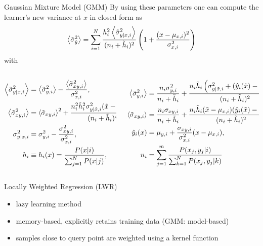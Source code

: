 \begin{frame}{Gaussian Mixture Model (GMM)}
By using these parameters one can compute the learner's new variance at $x$ in
closed form as
\begin{equation}
   \left< \tilde{\sigma}_{\hat{y}}^2 \right> = \sum_{i=1}^N
   \frac{h_i^2 \left< \tilde{\sigma}_{y|x,i}^2 \right>}{ (n_i+\tilde{h}_i)^2}
   \left( 1+\frac{(x-\mu_{x,i})^2}{\sigma_{x,i}^2} \right)
\end{equation}
with
\footnotesize
\begin{columns}[t]
\begin{column}{0.45\textwidth}
\[\begin{split}
\left< \tilde{\sigma}_{y|x,i}^2 \right> &= \left< \tilde{\sigma}_{y,i}^2 \right> - \frac{\left< \tilde{\sigma}_{xy,i}^2 \right>}{\sigma_{x,i}^2},\\
\left< \tilde{\sigma}_{xy,i}^2 \right> &= \left< \tilde{\sigma}_{xy,i} \right>^2 +
\frac{n_i^2\tilde{h}_i^2\sigma_{y|\tilde{x},i}^2(\tilde{x}-\mu_{x,i})^2}{(n_i+\tilde{h}_i)^4},\\
\sigma_{y|x,i}^2 &= \sigma_{y,i}^2 - \frac{\sigma_{xy,i}^2}{\sigma_{x,i}^2},\\
h_i &\equiv h_i(x) = \frac{P(x|i)}{\sum_{j=1}^N P(x|j)},
\end{split}\]
\end{column}
\begin{column}{0.55\textwidth}
\[\begin{split}
\left< \tilde{\sigma}_{y,i}^2 \right> &= \frac{n_i\sigma_{y,i}^2}{n_i+\tilde{h}_i} +
\frac{n_i\tilde{h}_i\left(\sigma_{y|\tilde{x},i}^2 + (\hat{y}_i(\tilde{x})-\mu_{y,i})^2 \right)}
{(n_i+\tilde{h}_i)^2}, \\
\left< \tilde{\sigma}_{xy,i} \right> &= \frac{n_i\sigma_{xy,i}}{n_i+\tilde{h}_i} +
\frac{n_i\tilde{h}_i (\tilde{x}-\mu_{x,i})(\hat{y}_i(\tilde{x})-\mu_{y,i})}
{(n_i+\tilde{h}_i)^2},\\
\hat{y}_i(x) &= \mu_{y,i} + \frac{\sigma_{xy,i}}{\sigma_{x,i}^2}(x-\mu_{x,i}), \\
n_i &= \sum_{j=1}^m \frac{P(x_j,y_j|i)}{\sum_{k=1}^N P(x_j,y_j|k)}
\end{split}\]
\end{column}
\end{columns}
\end{frame}


\begin{frame}{Locally Weighted Regression (LWR)}

\begin{itemize}
\item lazy learning method
\item memory-based, explicitly retains training data (GMM: model-based)
\item samples close to query point are weighted using a kernel function
\end{itemize}

\end{frame}

